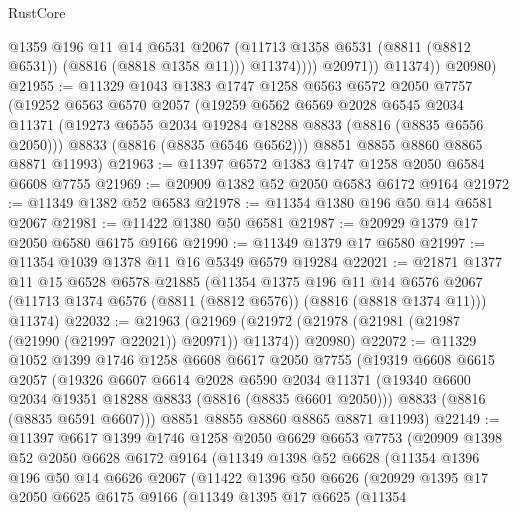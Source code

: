 \begin{lexlean}{RustCore}
\begin{coremodule}
                      @1359
                      @196
                      @11
                      @14
                      @6531
                      @2067
                      (@11713 @1358 @6531 (@8811 (@8812 @6531)) (@8816 (@8818 @1358 @11)))
                      @11374))))
              @20971))
          @11374))
      @20980)
@21955 := @11329
    @1043
    @1383
    @1747
    @1258
    @6563
    @6572
    @2050
    @7757
    (@19252
      @6563
      @6570
      @2057
      (@19259
        @6562
        @6569
        @2028
        @6545
        @2034
        @11371
        (@19273 @6555 @2034 @19284 @18288 @8833 (@8816 (@8835 @6556 @2050)))
        @8833
        (@8816 (@8835 @6546 @6562)))
      @8851
      @8855
      @8860
      @8865
      @8871
      @11993)
@21963 := @11397 @6572 @1383 @1747 @1258 @2050 @6584 @6608 @7755
@21969 := @20909 @1382 @52 @2050 @6583 @6172 @9164
@21972 := @11349 @1382 @52 @6583
@21978 := @11354 @1380 @196 @50 @14 @6581 @2067
@21981 := @11422 @1380 @50 @6581
@21987 := @20929 @1379 @17 @2050 @6580 @6175 @9166
@21990 := @11349 @1379 @17 @6580
@21997 := @11354 @1039 @1378 @11 @16 @5349 @6579 @19284
@22021 := @21871
    @1377
    @11
    @15
    @6528
    @6578
    @21885
    (@11354
      @1375
      @196
      @11
      @14
      @6576
      @2067
      (@11713 @1374 @6576 (@8811 (@8812 @6576)) (@8816 (@8818 @1374 @11)))
      @11374)
@22032 := @21963
    (@21969 (@21972 (@21978 (@21981 (@21987 (@21990 (@21997 @22021)) @20971)) @11374)) @20980)
@22072 := @11329
    @1052
    @1399
    @1746
    @1258
    @6608
    @6617
    @2050
    @7755
    (@19319
      @6608
      @6615
      @2057
      (@19326
        @6607
        @6614
        @2028
        @6590
        @2034
        @11371
        (@19340 @6600 @2034 @19351 @18288 @8833 (@8816 (@8835 @6601 @2050)))
        @8833
        (@8816 (@8835 @6591 @6607)))
      @8851
      @8855
      @8860
      @8865
      @8871
      @11993)
@22149 := @11397
    @6617
    @1399
    @1746
    @1258
    @2050
    @6629
    @6653
    @7753
    (@20909
      @1398
      @52
      @2050
      @6628
      @6172
      @9164
      (@11349
        @1398
        @52
        @6628
        (@11354
          @1396
          @196
          @50
          @14
          @6626
          @2067
          (@11422
            @1396
            @50
            @6626
            (@20929
              @1395
              @17
              @2050
              @6625
              @6175
              @9166
              (@11349
                @1395
                @17
                @6625
                (@11354

\end{coremodule}
\end{lexlean}
